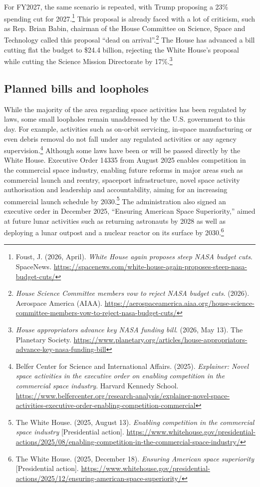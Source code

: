 For FY2027, the same scenario is repeated, with Trump proposing a 23\% spending cut for 2027.\footnote{Foust, J. (2026, April). \emph{White House again proposes steep NASA budget cuts}. SpaceNews. \url{https://spacenews.com/white-house-again-proposes-steep-nasa-budget-cuts/}} This proposal is already faced with a lot of criticism, such as Rep. Brian Babin, chairman of the House Committee on Science, Space and Technology called this proposal “dead on arrival”.\footnote{\emph{House Science Committee members vow to reject NASA budget cuts}. (2026). Aerospace America (AIAA). \url{https://aerospaceamerica.aiaa.org/house-science-committee-members-vow-to-reject-nasa-budget-cuts/}} The House has advanced a bill cutting flat the budget to \$24.4 billion, rejecting the White House’s proposal while cutting the Science Mission Directorate by 17\%.\footnote{\emph{House appropriators advance key NASA funding bill}. (2026, May 13). The Planetary Society. \url{https://www.planetary.org/articles/house-appropriators-advance-key-nasa-funding-bill}}

\subsection{Planned bills and loopholes}

While the majority of the area regarding space activities has been regulated by laws, some small loopholes remain unaddressed by the U.S. government to this day. For example, activities such as on-orbit servicing, in-space manufacturing or even debris removal do not fall under any regulated activities or any agency supervision.\footnote{Belfer Center for Science and International Affairs. (2025). \emph{Explainer: Novel space activities in the executive order on enabling competition in the commercial space industry}. Harvard Kennedy School. \url{https://www.belfercenter.org/research-analysis/explainer-novel-space-activities-executive-order-enabling-competition-commercial}} Although some laws have been or will be passed directly by the White House. Executive Order 14335 from August 2025 enables competition in the commercial space industry, enabling future reforms in major areas such as commercial launch and reentry, spaceport infrastructure, novel space activity authorisation and leadership and accountability, aiming for an increasing commercial launch schedule by 2030.\footnote{The White House. (2025, August 13). \emph{Enabling competition in the commercial space industry} [Presidential action]. \url{https://www.whitehouse.gov/presidential-actions/2025/08/enabling-competition-in-the-commercial-space-industry/}} The administration also signed an executive order in December 2025, “Ensuring American Space Superiority,” aimed at future lunar activities such as returning astronauts by 2028 as well as deploying a lunar outpost and a nuclear reactor on its surface by 2030.\footnote{The White House. (2025, December 18). \emph{Ensuring American space superiority} [Presidential action]. \url{https://www.whitehouse.gov/presidential-actions/2025/12/ensuring-american-space-superiority/}}

